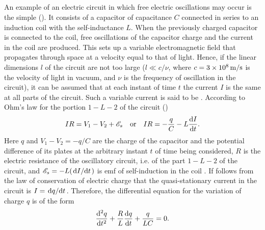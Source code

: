 \subsection{}\label{28.3.1} An example of an electric circuit in which free electric oscillations may occur is the simple  (). It consists of a capacitor of capacitance $C$ connected in series to an induction coil with the self-inductance $L$. When the previously charged capacitor is connected to the coil, free oscillations of the capacitor charge and the current in the coil are produced. This sets up a variable electromagnetic field that propagates through space at a velocity equal to that of light. Hence, if the linear dimensions $l$ of the circuit are not too large ($l \ll c/\nu$, where $c = \SI{3d8}{\meter\per\second}$ is the velocity of light in vacuum, and $\nu$ is the frequency of oscillation in the circuit), it can be assumed that at each instant of time $t$ the current $I$ is the same at all parts of the circuit. Such a variable current is
said to be . According to Ohm's law  for the portion $\mathit{1}-L-\mathit{2}$ of the circuit ()
\begin{equation*}%
IR = V_{1} - V_{2} + \emf_{s} \qor IR = -\frac{q}{C} - L \dv{I}{t}.
\end{equation*}
Here $q$ and $V_{1} - V_{2} = - q/C$ are the charge of the capacitor and the potential difference of its plates at the arbitrary instant $t$ of time being considered, $R$ is the electric resistance of the oscillatory circuit, i.e. of the part $\mathit{1}-L-\mathit{2}$ of the circuit, and
$ \mathscr{E}_{s} = -L (\dv*{I}{t})$ is emf of self-induction in the coil . If follows from the law of conservation of electric charge  that the quasi-stationary current in the circuit is $I = \dv*{q}{t}$. Therefore, the differential equation for the variation of charge $q$ is of the form
\begin{equation*}%
\dv[2]{q}{t} + \frac{R}{L} \dv{q}{t} + \frac{q}{LC} = 0.
\end{equation*}

